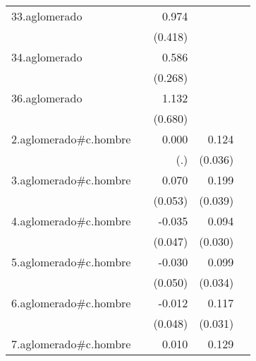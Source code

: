 {\begin{longtable}{l*{4}{D{.}{.}{-1}}}
\addlinespace
33.aglomerado&                     &       0.974\sym{*}  &                     &                     \\
            &                     &     (0.418)         &                     &                     \\
\addlinespace
34.aglomerado&                     &       0.586\sym{*}  &                     &                     \\
            &                     &     (0.268)         &                     &                     \\
\addlinespace
36.aglomerado&                     &       1.132         &                     &                     \\
            &                     &     (0.680)         &                     &                     \\
\addlinespace
2.aglomerado#c.hombre&                     &       0.000         &       0.124\sym{***}&                     \\
            &                     &         (.)         &     (0.036)         &                     \\
\addlinespace
3.aglomerado#c.hombre&                     &       0.070         &       0.199\sym{***}&                     \\
            &                     &     (0.053)         &     (0.039)         &                     \\
\addlinespace
4.aglomerado#c.hombre&                     &      -0.035         &       0.094\sym{**} &                     \\
            &                     &     (0.047)         &     (0.030)         &                     \\
\addlinespace
5.aglomerado#c.hombre&                     &      -0.030         &       0.099\sym{**} &                     \\
            &                     &     (0.050)         &     (0.034)         &                     \\
\addlinespace
6.aglomerado#c.hombre&                     &      -0.012         &       0.117\sym{***}&                     \\
            &                     &     (0.048)         &     (0.031)         &                     \\
\addlinespace
7.aglomerado#c.hombre&                     &       0.010         &       0.129\sym{***}&                     \\

\end{longtable}}
